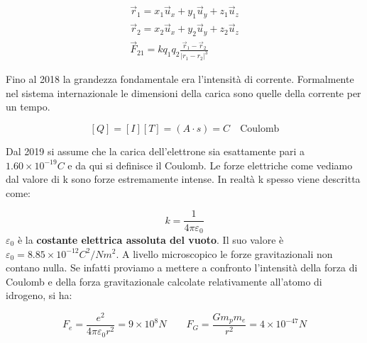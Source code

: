 \begin{figure}[htpb]
\end{figure}
\FloatBarrier

\begin{gather*}
	\vec{r}_1 = x_1\vec{u}_x+y_1\vec{u}_y+z_1\vec{u}_z \\
	\vec{r}_2 = x_2\vec{u}_x+y_2\vec{u}_y+z_2\vec{u}_z \\
	\vec{F}_{21} = k q_1q_2 \frac{\vec{r}_1-\vec{r}_2}{|r_1-r_2  |^3}
\end{gather*}

Fino al 2018 la grandezza fondamentale era l'intensità di corrente. Formalmente nel sistema internazionale le dimensioni della carica sono quelle della corrente per un tempo.

\[
	[Q] = [I][T] = (A\cdot s) = C \quad \text{Coulomb}
\]

Dal 2019 si assume che la carica dell'elettrone sia esattamente pari a $1.60 \times 10^{-19} C$ e da qui si definisce il Coulomb. Le forze elettriche come vediamo dal valore di k sono forze estremamente intense. In realtà k spesso viene descritta come:

\[
	k=\frac{1}{4\pi \varepsilon_0}
\]
$\varepsilon_0$ è la \textbf{costante elettrica assoluta del vuoto}. Il suo valore è $\varepsilon_0 = 8.85 \times 10^{-12} C^2 / N m^2$.
A livello microscopico le forze gravitazionali non contano nulla. Se infatti proviamo a mettere a confronto l'intensità della forza di Coulomb e della forza gravitazionale calcolate relativamente all'atomo di idrogeno, si ha:

\[
	F_e = \frac{e^2}{4\pi \varepsilon_0 r^2} = 9\times 10^8N \qquad F_G = \frac{G m_p m_e}{r^2}   =4\times 10^{-47} N
\]

